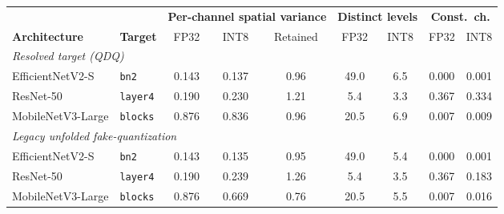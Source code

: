 \begin{tabular}{llccccccc}
\toprule
 & & \multicolumn{3}{c}{\textbf{Per-channel spatial variance}} & \multicolumn{2}{c}{\textbf{Distinct levels}} & \multicolumn{2}{c}{\textbf{Const.\ ch.}} \\
\cmidrule(lr){3-5}\cmidrule(lr){6-7}\cmidrule(lr){8-9}
\textbf{Architecture} & \textbf{Target} & FP32 & INT8 & Retained & FP32 & INT8 & FP32 & INT8 \\
\midrule
\multicolumn{9}{l}{\emph{Resolved target (QDQ)}} \\
EfficientNetV2-S  & \texttt{bn2}    & 0.143 & 0.137 & 0.96 & 49.0 & 6.5 & 0.000 & 0.001 \\
ResNet-50         & \texttt{layer4} & 0.190 & 0.230 & 1.21 &  5.4 & 3.3 & 0.367 & 0.334 \\
MobileNetV3-Large & \texttt{blocks} & 0.876 & 0.836 & 0.96 & 20.5 & 6.9 & 0.007 & 0.009 \\
\midrule
\multicolumn{9}{l}{\emph{Legacy unfolded fake-quantization}} \\
EfficientNetV2-S  & \texttt{bn2}    & 0.143 & 0.135 & 0.95 & 49.0 & 5.4 & 0.000 & 0.001 \\
ResNet-50         & \texttt{layer4} & 0.190 & 0.239 & 1.26 &  5.4 & 3.5 & 0.367 & 0.183 \\
MobileNetV3-Large & \texttt{blocks} & 0.876 & 0.669 & 0.76 & 20.5 & 5.5 & 0.007 & 0.016 \\
\bottomrule
\end{tabular}
